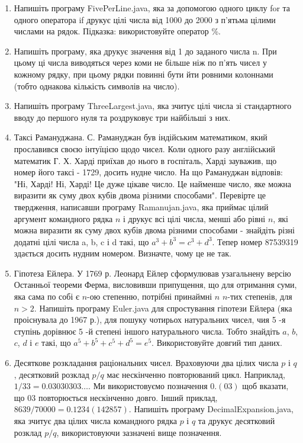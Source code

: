 \documentclass[]{article}
\begin{document}
\begin{enumerate}
\def\labelenumi{4.\arabic{enumi}.}

\item Напишіть програму FivePerLine.java, яка за допомогою одного циклу
 for та одного оператора if друкує цілі числа від 1000 до 2000 з п’ятьма цілими числами на рядок. Підказка: використовуйте оператор \%.

\item
Напишіть програму, яка друкує значення від 1 до заданого числа n. При цьому ці числа виводяться через коми не більше ніж по п'ять
чисел у кожному рядку, при цьому рядки повинні бути йти ровними колоннами (тобто однакова кількість символів на число).

\item
 Напишіть програму ThreeLargest.java, яка зчитує цілі числа зі стандартного вводу до першого нуля та роздруковує три найбільші з них.

\item Таксі Рамануджана. С. Рамануджан був індійським математиком, який прославився своєю інтуїцією щодо чисел.
 Коли одного разу англійський математик Г. Х. Харді приїхав до нього в госпіталь, Харді зауважив, що номер його таксі - 1729,
 досить нудне число. На що Рамануджан відповів: "Ні, Харді! Ні, Харді! Це дуже цікаве число.
Це найменше число, яке можна виразити як суму двох кубів двома різними способами".
Перевірте це твердження, написавши програму Ramanujan.java, яка приймає цілий аргумент командного рядка $n$ і друкує всі цілі числа,
 менші або рівні $n$, які можна виразити як суму двох кубів двома різними способами - знайдіть різні додатні цілі числа a, b, c і d такі,
 що $a^{3} + b^{3} = c^{3} + d^{3}$. 
Тепер номер 87539319 здається досить нудним номером. Визначте, чому це не так.

\item   Гіпотеза Ейлера.
У 1769 р. Леонард Ейлер сформулював узагальнену версію Останньої теореми Ферма, висловивши припущення, що для отримання суми,
 яка сама по собі є $n$-ою степенню, потрібні принаймні $n$ $n$-тих степенів, для $n>2$.
Напишіть програму Euler.java для спростування гіпотези Ейлера (яка проіснувала до 1967 р.),
для пошуку чотирьох натуральних чисел, чия 5 -я ступінь дорівнює 5 -й степені іншого натурального числа.
Тобто знайдіть $a$, $b$, $c$, $d$ і $e$ такі, що $a^{5} + b^{5} + c^{5} + d^{5} = e^{5}$.
Використовуйте довгий тип даних.


\item Десяткове розкладання раціональних чисел.
Враховуючи два цілих числа $p$ і $q$, десятковий розклад $p/q$ має нескінченно повторюваний цикл.
Наприклад, $1/33 = 0.03030303\ldots$. Ми використовуємо позначення $0.(03)$ щоб вказати, що $03$ повторюється нескінченно довго.
Інший приклад, $8639/70000 = 0.1234(142857)$.
Напишіть програму DecimalExpansion.java, яка зчитує два цілих числа командного рядка $p$ і $q$ та друкує десятковий розклад $p/q$,
 використовуючи зазначені вище позначення. 


\end{enumerate}
\end{document}
